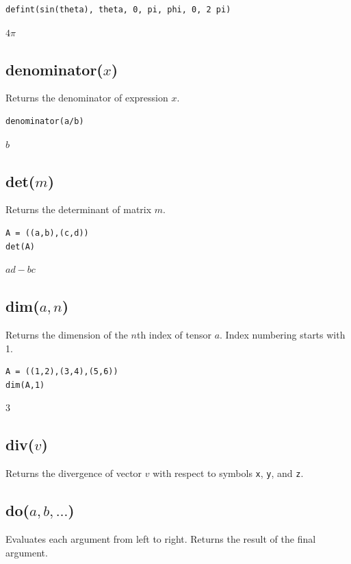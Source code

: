 \documentclass[12pt]{article}
\begin{document}
{\color{blue}
\begin{verbatim}
defint(sin(theta), theta, 0, pi, phi, 0, 2 pi)
\end{verbatim}
}

\noindent
$4\pi$

\subsection*{denominator($x$)}

Returns the denominator of expression $x$.

{\color{blue}
\begin{verbatim}
denominator(a/b)
\end{verbatim}
}

\noindent
$b$

\subsection*{det($m$)}

Returns the determinant of matrix $m$.

{\color{blue}
\begin{verbatim}
A = ((a,b),(c,d))
det(A)
\end{verbatim}
}

\noindent
$a d - b c$

\subsection*{dim($a,n$)}

Returns the dimension of the $n$th index of tensor $a$.
Index numbering starts with 1.

{\color{blue}
\begin{verbatim}
A = ((1,2),(3,4),(5,6))
dim(A,1)
\end{verbatim}
}

\noindent
$3$

\subsection*{div($v$)}

Returns the divergence of vector $v$ with respect to symbols \verb$x$, \verb$y$, and \verb$z$.

\subsection*{do($a,b,\ldots$)}

Evaluates each argument from left to right.
Returns the result of the final argument.
\end{document}
